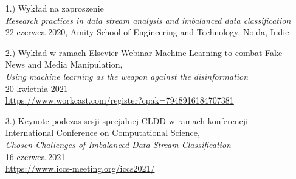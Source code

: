\begin{itemize}
	\item[1.)] Wykład na zaproszenie\\
	\emph{Research practices in data stream analysis and imbalanced data classification}\\
	22 czerwca 2020, Amity School of Engineering and Technology, Noida, Indie\\
	
	\item[2.)] Wykład w ramach Elsevier Webinar Machine Learning to combat Fake News and Media Manipulation,\\
	\emph{Using machine learning as the weapon against the disinformation}\\
	20 kwietnia 2021\\
	\url{https://www.workcast.com/register?cpak=7948916184707381}\\
	
	\item[3.)] Keynote podczas sesji specjalnej CLDD w ramach konferencji International Conference on Computational Science,\\
		\emph{Chosen Challenges of Imbalanced Data Stream Classification}\\
		16 czerwca 2021\\
		\url{https://www.iccs-meeting.org/iccs2021/}\\
\end{itemize}

